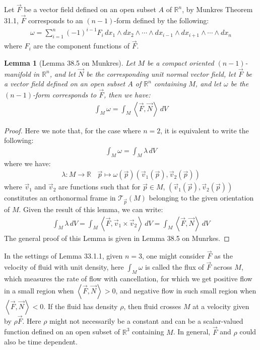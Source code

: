 \documentclass[11pt,oneside]{book}
\theoremstyle{break}
\theoremstyle{break}
\newtheorem{lem}{Lemma}[thm]
\newcommand{\R}{\mathbb{R}}
\newcommand{\T}{\mathcal{T}}
\begin{document}
Let $\vec{F}$ be a vector field defined on an open subset $A$ of $\R^n$, by Munkres Theorem 31.1, $\vec{F}$ corresponds to an $(n-1)$-form defined by the following:
\begin{align*}
\omega = \sum_{i=1}^n (-1)^{i-1}F_i\, dx_1 \wedge dx_2 \wedge \cdots \wedge dx_{i-1}\wedge dx_{i+1}\wedge \cdots \wedge dx_n
\end{align*}
where $F_i$ are the component functions of $\vec{F}$. 

\begin{lem}[Lemma 38.5 on Munkres]
Let $M$ be a compact oriented $(n-1)$-manifold in $\R^n$, and let $\vec{N}$ be the corresponding unit normal vector field, let $\vec{F}$ be a vector field defined on an open subset $A$ of $\R^n$ containing $M$, and let $\omega$ be the $(n-1)$-form corresponds to $\vec{F}$, then we have:
\begin{align*}
\int_M \omega = \int_M \left< \vec{F},\vec{N}\right> \, dV
\end{align*}
\end{lem}
\begin{proof}
Here we note that, for the case where $n=2$, it is equivalent to write the following:
\begin{align*}
\int_M \omega = \int_M \lambda\, dV 
\end{align*}
where we have:
\begin{align*}
\lambda:M \to \R \ \ \ \ \vec{p}\mapsto \omega(\vec{p})(\vec{v}_1(\vec{p}),\vec{v}_2(\vec{p})) 
\end{align*}
where $\vec{v}_1$ and $\vec{v}_2$ are functions such that for $\vec{p}\in M$, $(\vec{v}_1(\vec{p}),\vec{v}_2(\vec{p})) $ constitutes an orthonormal frame in $\T_{\vec{p}}(M)$ belonging to the given orientation of $M$. Given the result of this lemma, we can write:
\begin{align*}
\int_M \lambda\, dV  =  \int_M \left< \vec{F},\vec{v}_1\times \vec{v}_2\right> \, dV =   \int_M \left< \vec{F},\vec{N}\right> \, dV
\end{align*}
The general proof of this Lemma is given in Lemma 38.5 on Munrkes. 
\end{proof}

In the settings of Lemma 33.1.1, given $n=3$, one might consider $\vec{F}$ as the velocity of fluid with unit density, here $\int_M \omega$ is called the flux of $\vec{F}$ across $M$, which measures the rate of flow with cancellation, for which we get positive flow in a small region when $\left<\right.\vec{F}, \vec{N}\left.\right>>0$, and negative flow in such small region when $\left<\right.\vec{F},\vec{N}\left.\right>< 0$. If the fluid has density $\rho$, then fluid crosses $M$ at a velocity given by $\rho \vec{F}$. Here $\rho$ might not necessarily be a constant and can be a scalar-valued function defined on an open subset of $\R^3$ containing $M$. In general, $\vec{F}$ and $\rho$ could also be time dependent. \\
\end{document}
